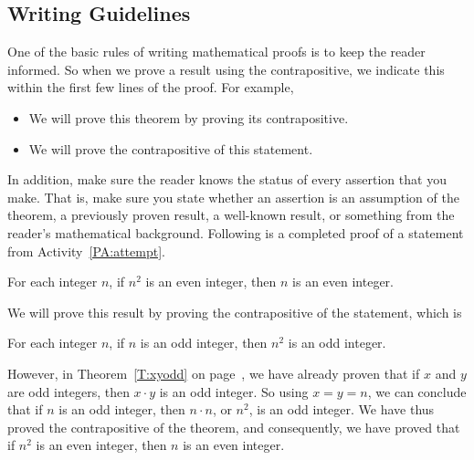 \subsection*{Writing Guidelines} 
%
One of the basic rules of writing mathematical proofs is to keep the reader informed.  So when we prove a result using the contrapositive, we indicate this within the first few lines of the proof.  For example, 
\begin{itemize}
  \item We will prove this theorem by proving its contrapositive.

  \item We will prove the contrapositive of this statement.
\end{itemize}

In addition, make sure the reader knows the status of every assertion that you make.  That is, make sure you state whether an assertion is an assumption of the theorem, a previously proven result, a well-known result, or something from the reader's mathematical background. 
Following is a completed proof of a statement from 
\typeu Activity~\ref*{PA:attempt}.

\begin{theorem}\label{T:n2odd}
For each integer $n$, if $n^2$ is an even integer, then $n$ is an even integer.
\end{theorem}
%
\begin{myproof}
We will prove this result by proving the contrapositive of the statement, which is

\begin{list}{}
  \item For each integer $n$, if  $n$  is an odd integer, then  $n^2 $  is an odd integer.
\end{list}

\newpar
However, in Theorem~\ref{T:xyodd} on page~\pageref{T:xyodd}, we have already proven that if $x$ and $y$ are odd integers, then $x \cdot y$ is an odd integer.  So using $x = y = n$, we can conclude that if $n$ is an odd integer, then $n \cdot n$, or $n^2$, is an odd integer.
%
We have thus proved the contrapositive of the theorem, and consequently, we have proved that if  $n^2 $ is an even integer, then  $n$  is an even integer.
\end{myproof}
\hbreak

\endinput
